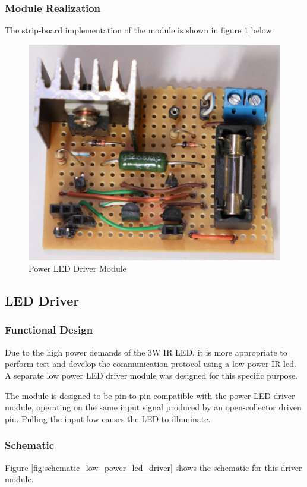 \subsubsection{Module Realization}
The strip-board implementation of the module is shown in figure \ref{fig:module_power_led_driver} below.

\begin{figure}[H]
	\centering
	\includegraphics[width=.6\textwidth]{figures/modules/power_led_driver.jpg}
	\caption{Power LED Driver Module}
	\label{fig:module_power_led_driver}
\end{figure}







\subsection{LED Driver}

\subsubsection{Functional Design}
Due to the high power demands of the 3W IR LED, it is more appropriate to perform test and develop the communication protocol using a low power IR led. A separate low power LED driver module was designed for this specific purpose.

The module is designed to be pin-to-pin compatible with the power LED driver module, operating on the same input signal produced by an open-collector driven pin. Pulling the input low causes the LED to illuminate.



\subsubsection{Schematic}
Figure \ref{fig:schematic_low_power_led_driver} shows the schematic for this driver module.

